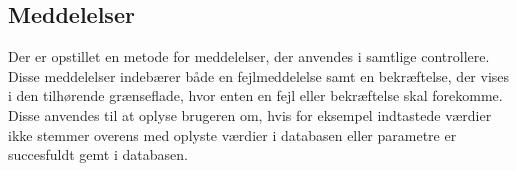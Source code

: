 \subsection*{Meddelelser}
Der er opstillet en metode for meddelelser, der anvendes i samtlige controllere. Disse meddelelser indebærer både en fejlmeddelelse samt en bekræftelse, der vises i den tilhørende grænseflade, hvor enten en fejl eller bekræftelse skal forekomme.
Disse anvendes til at oplyse brugeren om, hvis for eksempel indtastede værdier ikke stemmer overens med oplyste værdier i databasen eller parametre er succesfuldt gemt i databasen.  